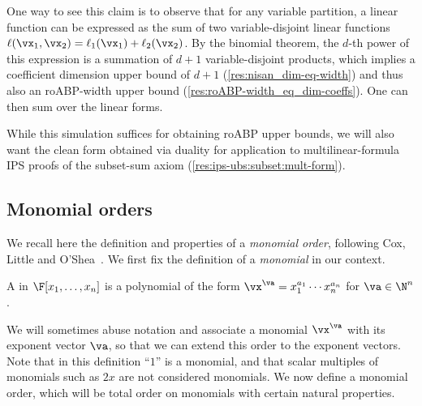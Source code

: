 \documentclass{toc}
\begin{document}
One way to see this claim is to observe that for any variable partition, a linear function can be expressed as the sum of two variable-disjoint linear functions $\ell(\vx_1,\vx_2)=\ell_1(\vx_1)+\ell_2(\vx_2)$.  By the binomial theorem, the $d$-th power of this expression is a summation of $d+1$ variable-disjoint products, which implies a coefficient dimension upper bound of $d+1$ (\autoref{res:nisan_dim-eq-width}) and thus also an roABP-width upper bound (\autoref{res:roABP-width_eq_dim-coeffs}).  One can then sum over the linear forms.

While this simulation suffices for obtaining roABP upper bounds, we will also want the clean form obtained via duality for application to multilinear-formula IPS proofs of the subset-sum axiom (\autoref{res:ips-ubs:subset:mult-form}).

\subsection{Monomial orders}\label{sec:mon-ord}

We recall here the definition and properties of a \emph{monomial order}, following Cox, Little and O'Shea~\cite{CoxLittleOShea07}.  We first fix the definition of a \emph{monomial} in our context.

\begin{definition}
        A  in $\F[x_1,\ldots,x_n]$ is a polynomial of the form $\vx^\va=x_1^{a_1}\cdots x_n^{a_n}$ for $\va\in\N^n$.
\end{definition}

We will sometimes abuse notation and associate a monomial $\vx^\va$ with its exponent vector $\va$, so that we can extend this order to the exponent vectors. Note that in this definition ``$1$'' is a monomial, and that scalar multiples of monomials such as $2x$ are not considered monomials. We now define a monomial order, which will be total order on monomials with certain natural properties.
\end{document}
